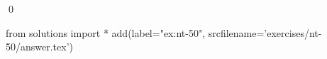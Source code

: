 
\begin{ex} 
  \label{ex:nt-50}
  
  \qed
\end{ex} 
\begin{python0}
from solutions import *
add(label="ex:nt-50",
    srcfilename='exercises/nt-50/answer.tex') 
\end{python0}
